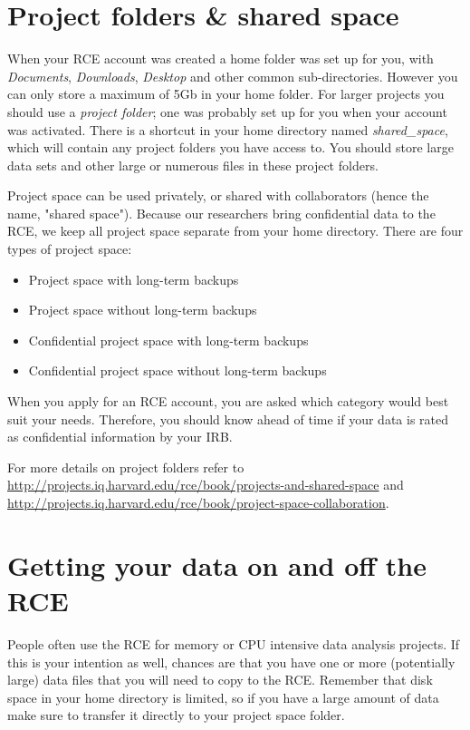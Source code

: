 \documentclass[11pt]{article}
\begin{document}
\section{Project folders \& shared space}
\label{sec-4}
When your RCE account was created a home folder was set up for you, with \emph{Documents}, \emph{Downloads}, \emph{Desktop} and other common sub-directories. However you can only store a maximum of 5Gb in your home folder. For larger projects you should use a \emph{project folder}; one was probably set up for you when your account was activated. There is a shortcut in your home directory named \emph{shared\_space}, which will contain any project folders you have access to. You should store large data sets and other large or numerous files in these project folders.

Project space can be used privately, or shared with collaborators (hence the name, "shared space"). Because our researchers bring confidential data to the RCE, we keep all project space separate from your home directory. There are four types of project space:
\begin{itemize}
\item Project space with long-term backups
\item Project space without long-term backups
\item Confidential project space with long-term backups
\item Confidential project space without long-term backups
\end{itemize}
When you apply for an RCE account, you are asked which category would best suit your needs. Therefore, you should know ahead of time if your data is rated as confidential information by your IRB.

For more details on project folders refer to \url{http://projects.iq.harvard.edu/rce/book/projects-and-shared-space} and \url{http://projects.iq.harvard.edu/rce/book/project-space-collaboration}.

\section{Getting your data on and off the RCE}
\label{sec-5}
People often use the RCE for memory or CPU intensive data analysis projects. If this is your intention as well, chances are that you have one or more (potentially large) data files that you will need to copy to the RCE. Remember that disk space in your home directory is limited, so if you have a large amount of data make sure to transfer it directly to your project space folder.
\end{document}
